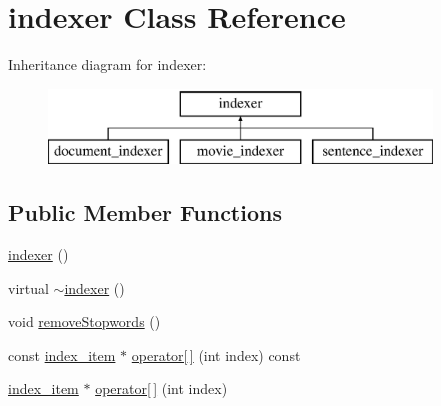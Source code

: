 \hypertarget{classindexer}{}\section{indexer Class Reference}
\label{classindexer}
Inheritance diagram for indexer\+:\begin{figure}[H]
\begin{center}
\leavevmode
\includegraphics[height=2.000000cm]{classindexer}
\end{center}
\end{figure}
\subsection*{Public Member Functions}
\begin{DoxyCompactItemize}
\item 
\hyperlink{classindexer_acbbcbad080a7ae43ed78840fcf006960}{indexer} ()
\item 
virtual \hyperlink{classindexer_acc872b85bb2520b0cf803801811c9e58}{$\sim$indexer} ()
\item 
void \hyperlink{classindexer_a8c173bf8a59861ffec816f5b79737a6e}{remove\+Stopwords} ()
\item 
const \hyperlink{classindex__item}{index\+\_\+item} $\ast$ \hyperlink{classindexer_a454e14897d75b7a89253e135faaef62a}{operator\mbox{[}$\,$\mbox{]}} (int index) const
\item 
\hyperlink{classindex__item}{index\+\_\+item} $\ast$ \hyperlink{classindexer_abcf129b0575f95fa455b69dfb51edc44}{operator\mbox{[}$\,$\mbox{]}} (int index)
\end{DoxyCompactItemize}
